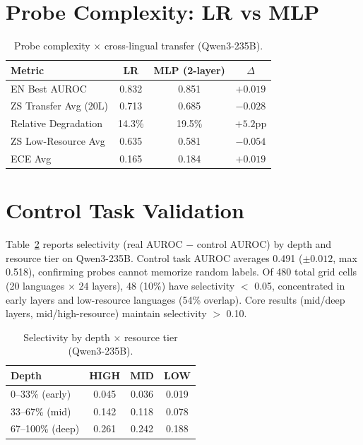 \documentclass[11pt,a4paper]{article}
\begin{document}
\section{Probe Complexity: LR vs MLP}
\label{app:probe_complexity}

\begin{table}[h]
\centering
\caption{Probe complexity $\times$ cross-lingual transfer (Qwen3-235B).}
\label{tab:probe_detail}
\small
\begin{tabular}{lccc}
\toprule
\textbf{Metric} & \textbf{LR} & \textbf{MLP (2-layer)} & \textbf{$\Delta$} \\
\midrule
EN Best AUROC         & 0.832  & 0.851  & $+0.019$ \\
ZS Transfer Avg (20L) & 0.713  & 0.685  & $-0.028$ \\
Relative Degradation   & 14.3\% & 19.5\% & $+5.2$pp \\
ZS Low-Resource Avg   & 0.635  & 0.581  & $-0.054$ \\
ECE Avg               & 0.165  & 0.184  & $+0.019$ \\
\bottomrule
\end{tabular}
\end{table}


\section{Control Task Validation}
\label{app:control}

Table~\ref{tab:control} reports selectivity (real AUROC $-$ control AUROC) by depth and resource tier on Qwen3-235B.
Control task AUROC averages 0.491 ($\pm 0.012$, max 0.518), confirming probes cannot memorize random labels.
Of 480 total grid cells (20 languages $\times$ 24 layers), 48 (10\%) have selectivity $<$ 0.05, concentrated in early layers and low-resource languages (54\% overlap).
Core results (mid/deep layers, mid/high-resource) maintain selectivity $>$ 0.10.

\begin{table}[h]
\centering
\caption{Selectivity by depth $\times$ resource tier (Qwen3-235B).}
\label{tab:control}
\small
\begin{tabular}{lccc}
\toprule
\textbf{Depth} & \textbf{HIGH} & \textbf{MID} & \textbf{LOW} \\
\midrule
0--33\% (early)  & 0.045 & 0.036 & 0.019 \\
33--67\% (mid)   & 0.142 & 0.118 & 0.078 \\
67--100\% (deep) & 0.261 & 0.242 & 0.188 \\
\bottomrule
\end{tabular}
\end{table}
\end{document}

